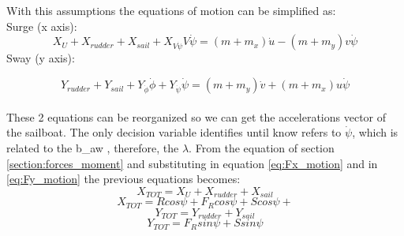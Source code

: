 With this assumptions the equations of motion can be simplified as: \\
Surge  (x axis):
\begin{equation}
       X_{U}+X_{rudder}+X_{sail}+X_{V\Dot{\psi}}V\Dot{\psi}  =(m+m_{x})\Dot{u}-(m+m_{y})v\Dot{\psi}
\end{equation}\label{eq:Fx_motion}
Sway  (y axis):\par 
\begin{equation}
\label{eq:Fy_motion}
Y_{rudder} + Y_{sail} + Y_{\Dot{\phi}} \Dot{\phi} + Y_{\Dot{\psi}} \Dot{\psi} 
=(m + m_{y})\Dot{v}  + (m + m_{x})u \Dot{\psi}
\end{equation}
\\
These 2 equations can be reorganized so we can get the accelerations vector of the sailboat. The only decision variable identifies until know refers to $\Dot{\psi}$, which is related to the \acrshort{b_aw}%
, therefore, the $\lambda$. 
From the equation of section \ref{section:forces_moment} and substituting in equation \ref{eq:Fx_motion} and in \ref{eq:Fy_motion} the previous equations becomes:
\begin{equation}\label{eq:X_tot}
    X_{TOT}=X_{U}+X_{rudder}+X_{sail}
\end{equation}
\begin{equation}\label{eq:X_tot2}
    X_{TOT}=Rcos\psi+F_{R}cos\psi+Scos\psi+
\end{equation}
\begin{equation}\label{eq:y_tot}
    Y_{TOT}=Y_{rudder}+Y_{sail}
\end{equation}
\begin{equation}
    Y_{TOT}=F_{R}sin\psi+S sin\psi
\end{equation}

